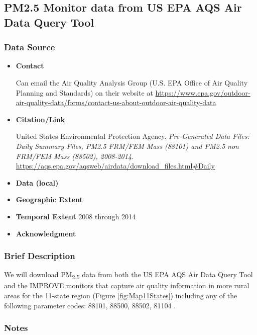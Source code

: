 \subsection{PM2.5 Monitor data from US EPA AQS Air Data Query Tool}

\subsubsection*{Data Source}

\begin{itemize}[nolistsep]
\item \textbf{Contact}

Can email the Air Quality Analysis Group (U.S. EPA Office of Air Quality Planning and Standards) on their website at \url{https://www.epa.gov/outdoor-air-quality-data/forms/contact-us-about-outdoor-air-quality-data}


\item \textbf{Citation/Link}

United States Environmental Protection Agency. \textit{Pre-Generated Data Files: Daily Summary Files, PM2.5 FRM/FEM Mass (88101) and PM2.5 non FRM/FEM Mass (88502), 2008-2014}. \url{https://aqs.epa.gov/aqsweb/airdata/download_files.html#Daily} 
\item \textbf{Data (local)}
\item \textbf{Geographic Extent}
\item \textbf{Temporal Extent}
2008 through 2014
\item \textbf{Acknowledgment}
\end{itemize}

\subsubsection*{Brief Description}

We will download PM\textsubscript{2.5} data from both the US EPA AQS Air Data Query Tool \citep{EPAAirData2017} and the IMPROVE monitors that capture air quality information in 
more rural areas \citep{EPANPM25IMPROVE2017} for the 11-state region (Figure \ref{fig:Map11States}) including any of the following parameter codes: 88101, 88500, 88502, 81104 \citep{EPANPM25Memo2017,EPANPM25Parameters2017,EPANAllParameters2017}. %

\subsubsection*{Notes}

